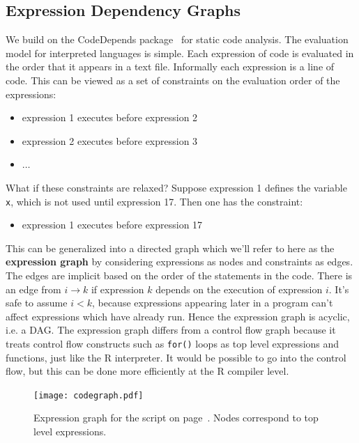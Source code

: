\documentclass[12pt]{article}
\begin{document}
\subsection{Expression Dependency Graphs}

\label{sec:expression_dependency}

We build on the CodeDepends package~\cite{R-CodeDepends} for static code
analysis.  The evaluation model for interpreted languages is simple. Each
expression of code is evaluated in the order that it appears in a text
file. Informally each expression is a line of code. This can be viewed as a
set of constraints on the evaluation order of the expressions:

\begin{itemize}
    \item expression 1 executes before expression 2
    \item expression 2 executes before expression 3
    \item $\dots$
\end{itemize}
What if these constraints are relaxed? Suppose expression 1 defines the variable
\texttt{x}, which is not used until expression 17. Then one has the
constraint:
\begin{itemize}
    \item expression 1 executes before expression 17
\end{itemize}
This can be generalized into a directed graph which we'll refer to here as
the \textbf{expression graph} by considering expressions as
nodes and constraints as edges. The edges are implicit based on the order
of the statements in the code. There is an edge from $i \rightarrow k$ if
expression $k$ depends on the execution of expression $i$.  It's safe to
assume $i < k$, because expressions appearing later in a program can't
affect expressions which have already run. Hence the expression graph is
acyclic, i.e. a DAG. The expression graph differs from a control flow
graph because it treats control flow constructs such as \texttt{for()}
loops as top level expressions and functions, just like the R interpreter.
It would be possible to go into the control flow, but this can be done more
efficiently at the R compiler level.



\begin{figure}
  \centering
  \texttt{[image: codegraph.pdf]}
  \caption{Expression graph for the script on
  page~\pageref{list:simple}. Nodes correspond to top level expressions.}
  \label{fig:codegraph}
\end{figure}
\end{document}
